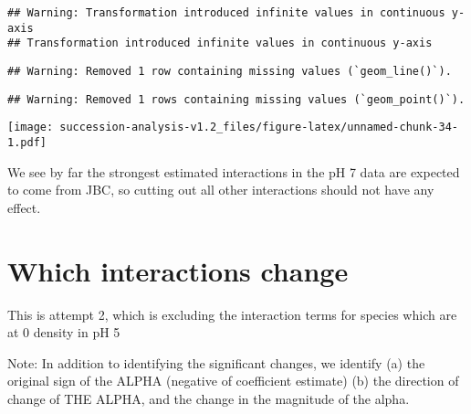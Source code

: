 \documentclass[
]{article}
\newenvironment{Shaded}{\begin{snugshade}}{\end{snugshade}}
\newcommand{\FloatTok}[1]{\textcolor[rgb]{0.00,0.00,0.81}{#1}}
\newcommand{\FunctionTok}[1]{\textcolor[rgb]{0.13,0.29,0.53}{\textbf{#1}}}
\newcommand{\NormalTok}[1]{#1}
\newcommand{\OtherTok}[1]{\textcolor[rgb]{0.56,0.35,0.01}{#1}}
\newcommand{\SpecialCharTok}[1]{\textcolor[rgb]{0.81,0.36,0.00}{\textbf{#1}}}
\newcommand{\StringTok}[1]{\textcolor[rgb]{0.31,0.60,0.02}{#1}}
\begin{document}
\begin{verbatim}
## Warning: Transformation introduced infinite values in continuous y-axis
## Transformation introduced infinite values in continuous y-axis
\end{verbatim}

\begin{verbatim}
## Warning: Removed 1 row containing missing values (`geom_line()`).
\end{verbatim}

\begin{verbatim}
## Warning: Removed 1 rows containing missing values (`geom_point()`).
\end{verbatim}

\texttt{[image: succession-analysis-v1.2\_files/figure-latex/unnamed-chunk-34-1.pdf]}

We see by far the strongest estimated interactions in the pH 7 data are
expected to come from JBC, so cutting out all other interactions should
not have any effect.

\hypertarget{which-interactions-change}{%
\section{Which interactions change}\label{which-interactions-change}}

This is attempt 2, which is excluding the interaction terms for species
which are at 0 density in pH 5

Note: In addition to identifying the significant changes, we identify
(a) the original sign of the ALPHA (negative of coefficient estimate)
(b) the direction of change of THE ALPHA, and the change in the
magnitude of the alpha.

\begin{Shaded}
\end{Shaded}
\end{document}
